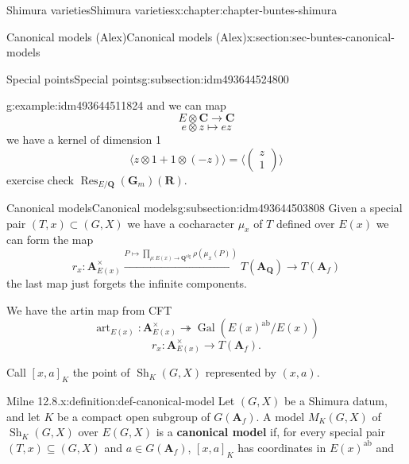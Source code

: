 \documentclass[oneside,10pt,]{book}
\newcommand{\terminology}[1]{\textbf{#1}}
\numberwithin{equation}{section}
\newcommand{\lb}{[}
\newcommand{\rb}{]}
\newcommand{\QQ}{\mathbf{Q}}
\newcommand{\RR}{\mathbf{R}}
\newcommand{\CC}{\mathbf{C}}
\newcommand{\adeles}{\mathbf{A}}
\newcommand{\alg}{\mathrm{alg}}
\newcommand{\ab}{\mathrm{ab}}
\newcommand{\Gal}[2]{\operatorname{Gal}(#1/#2)}
\DeclareMathOperator{\Res}{Res}
\begin{document}
\begin{chapterptx}{Shimura varieties}{}{Shimura varieties}{}{}{x:chapter:chapter-buntes-shimura}
\begin{sectionptx}{Canonical models (Alex)}{}{Canonical models (Alex)}{}{}{x:section:sec-buntes-canonical-models}
\begin{subsectionptx}{Special points}{}{Special points}{}{}{g:subsection:idm493644524800}
\begin{example}{}{g:example:idm493644511824}
and we can map%
\begin{equation*}
E\otimes \CC \to \CC
\end{equation*}
%
\begin{equation*}
e\otimes z \mapsto ez
\end{equation*}
we have a kernel of dimension 1%
\begin{equation*}
\langle z \otimes 1 + 1\otimes (-z) \rangle = \langle \begin{pmatrix} z \\ 1 \end{pmatrix}\rangle
\end{equation*}
exercise check \(\Res_{E/\QQ}(\mathbf G_m)(\RR)\).%
\end{example}
\end{subsectionptx}
%
%
\typeout{************************************************}
\typeout{************************************************}
%
\begin{subsectionptx}{Canonical models}{}{Canonical models}{}{}{g:subsection:idm493644503808}
Given a special pair \((T,x) \subset (G,X)\) we have a cocharacter \(\mu_x\) of \(T\) defined over \(E(x)\) we can form the map%
\begin{equation*}
r_x \colon \adeles^\times_{E(x)} \xrightarrow{ P \mapsto \prod_{\rho \colon E(x) \to \QQ^\alg} \rho(\mu_x(P)) } T(\adeles_\QQ) \to T(\adeles_f)
\end{equation*}
the last map just forgets the infinite components.%
\par
We have the artin map from CFT%
\begin{equation*}
{\operatorname{art}}_{E(x)} \colon \adeles^\times_{E(x)} \twoheadrightarrow \Gal{E(x)^\ab}{E(x)}
\end{equation*}
%
\begin{equation*}
r_x \colon \adeles^\times_{E(x)} \to T(\adeles_f)\text{.}
\end{equation*}
%
\par
Call \(\lb x,a\rb_K\) the point of \({\operatorname{Sh}}_K(G,X)\) represented by \((x,a)\).%
\begin{definition}{Milne 12.8.}{x:definition:def-canonical-model}%
Let \((G,X)\) be a Shimura datum, and let \(K\) be a compact open subgroup of \(G(\adeles_f)\). A model \(M_K(G,X)\) of \({\operatorname{Sh}}_K(G,X)\) over \(E(G,X)\) is a \terminology{canonical model} if, for every special pair \((T, x) \subseteq (G,X)\) and \(a \in G(\adeles_f)\), \(\lb x,a\rb _K\) has coordinates in \(E(x)^\ab\) and%

\end{definition}
\end{subsectionptx}
\end{sectionptx}
\end{chapterptx}
\end{document}
